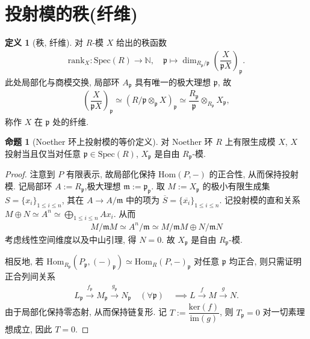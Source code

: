 \documentclass{MainStyle}
\theoremstyle{definition}
\theoremstyle{definition}
\theoremstyle{definition}
\newtheorem{definition}{定义}
\theoremstyle{definition}
\newtheorem{proposition}{命题}
\theoremstyle{definition}
\theoremstyle{definition}
\theoremstyle{definition}
\theoremstyle{remark}
\theoremstyle{remark}
\begin{document}
\maketitle


\section{投射模的秩(纤维)}

\begin{definition}[秩, 纤维]
    对 $R$-模 $X$ 给出的秩函数
    \begin{align*}
        \mathrm{rank}_{X}:\mathrm{Spec}(R)\to \mathbb N, \quad \mathfrak p\mapsto \dim_{R_{\mathfrak p}/\mathfrak p}\left(\dfrac{X}{\mathfrak p X}\right)_{\mathfrak p}.
    \end{align*}
    此处局部化与商模交换, 局部环 $A_{\mathfrak p}$ 具有唯一的极大理想 $\mathfrak p$, 故
    \begin{align*}
        \left(\dfrac{X}{\mathfrak p X}\right)_{\mathfrak p}\simeq (R/\mathfrak p\otimes _{\mathfrak p}X)_{\mathfrak p}\simeq \dfrac{R_{\mathfrak p}}{\mathfrak p}\otimes_{R_{\mathfrak p}} X_{\mathfrak p},
    \end{align*}
    称作 $X$ 在 $\mathfrak p$ 处的纤维.
\end{definition}

\begin{proposition}[Noether 环上投射模的等价定义]\label{noether-proj-freerank}
    对 Noether 环 $R$ 上有限生成模 $X$, $X$ 投射当且仅当对任意 $\mathfrak p\in \mathrm{Spec}(R)$, $X_{\mathfrak p}$ 是自由 $R_{\mathfrak p}$-模.
    \begin{proof}
        注意到 $P$ 有限表示, 故局部化保持 $\mathrm{Hom}(P,-)$ 的正合性, 从而保持投射模. 记局部环 $A:=R_{\mathfrak p}$,极大理想 $\mathfrak m:=\mathfrak p_{\mathfrak p}$. 取 $M:=X_{\mathfrak p}$ 的极小有限生成集 $S=\{x_i\}_{1\leq i\leq n}$, 其在 $A\to A/\mathfrak m$ 中的项为 $\overline S=\{\overline{x_i}\}_{1\leq i\leq n}$. 记投射模的直和关系 $M\oplus N\simeq A^n\simeq \bigoplus_{1\leq i\leq n}Ax_i$. 从而
        \begin{align*}
            M/\mathfrak mM\simeq A^n/\mathfrak m\simeq M/\mathfrak m M\oplus N/\mathfrak mN
        \end{align*}
        考虑线性空间维度以及中山引理, 得 $N=0$. 故 $X_{\mathfrak p}$ 是自由 $R_\mathfrak p$-模.\par
        相反地, 若 $\mathrm{Hom}_{R_{\mathfrak p}}(P_{\mathfrak p},(-)_{\mathfrak p})\simeq \mathrm{Hom}_R(P,-)_{\mathfrak p}$ 对任意 $\mathfrak p$ 均正合, 则只需证明正合列间关系
        \begin{align*}
            L_\mathfrak p\overset{f_\mathfrak p}\longrightarrow M_\mathfrak p\overset{g_\mathfrak p}\longrightarrow N_\mathfrak p \quad (\forall \mathfrak p)\quad \implies L\overset f\longrightarrow M\overset g\longrightarrow N.
        \end{align*}
        由于局部化保持零态射, 从而保持链复形. 记 $T:=\dfrac{\mathrm{ker}(f)}{\mathrm{im}(g)}$, 则 $T_{\mathfrak p}=0$ 对一切素理想成立, 因此 $T=0$.
    \end{proof}
\end{proposition}
\end{document}
